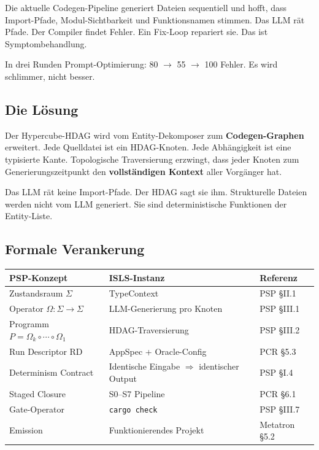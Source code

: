 \documentclass[11pt,a4paper]{article}
\begin{document}
Die aktuelle Codegen-Pipeline generiert Dateien sequentiell und hofft,
dass Import-Pfade, Modul-Sichtbarkeit und Funktionsnamen stimmen.
Das LLM rät Pfade. Der Compiler findet Fehler. Ein Fix-Loop
repariert sie. Das ist Symptombehandlung.

In drei Runden Prompt-Optimierung: 80 $\to$ 55 $\to$ 100 Fehler.
Es wird schlimmer, nicht besser.

\subsection{Die Lösung}

Der Hypercube-HDAG wird vom Entity-Dekomposer zum \textbf{Codegen-Graphen}
erweitert. Jede Quelldatei ist ein HDAG-Knoten. Jede Abhängigkeit ist
eine typisierte Kante. Topologische Traversierung erzwingt, dass jeder
Knoten zum Generierungszeitpunkt den \textbf{vollständigen Kontext}
aller Vorgänger hat.

Das LLM rät keine Import-Pfade. Der HDAG sagt sie ihm.
Strukturelle Dateien werden nicht vom LLM generiert.
Sie sind deterministische Funktionen der Entity-Liste.

\subsection{Formale Verankerung}

\begin{center}
\begin{tabular}{lll}
\toprule
\textbf{PSP-Konzept} & \textbf{ISLS-Instanz} & \textbf{Referenz} \\
\midrule
Zustandsraum $\Sigma$ & TypeContext & PSP §II.1 \\
Operator $\Omega: \Sigma \to \Sigma$ & LLM-Generierung pro Knoten & PSP §III.1 \\
Programm $P = \Omega_k \circ \cdots \circ \Omega_1$ & HDAG-Traversierung & PSP §III.2 \\
Run Descriptor RD & AppSpec + Oracle-Config & PCR §5.3 \\
Determinism Contract & Identische Eingabe $\Rightarrow$ identischer Output & PSP §I.4 \\
Staged Closure & S0--S7 Pipeline & PCR §6.1 \\
Gate-Operator & \texttt{cargo check} & PSP §III.7 \\
Emission & Funktionierendes Projekt & Metatron §5.2 \\
\bottomrule
\end{tabular}
\end{center}
\end{document}

